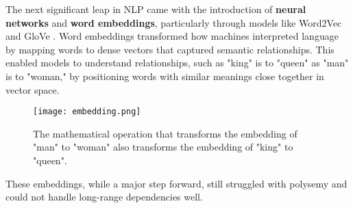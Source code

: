 

The next significant leap in NLP came with the introduction of \textbf{neural networks} and \textbf{word embeddings}, particularly through models like Word2Vec \cite{rong2014word2vec} and GloVe \cite{pennington2014glove}.
Word embeddings transformed how machines interpreted language by mapping words to dense vectors that captured semantic relationships.
This enabled models to understand relationships, such as "king" is to "queen" as "man" is to "woman," by positioning words with similar meanings close together in vector space.

\begin{figure}[!h]
    \centering
    \texttt{[image: embedding.png]}
    \caption{The mathematical operation that transforms the embedding of "man" to "woman" also transforms the embedding of "king" to "queen".}
    \vspace{0.1cm} \label{fig
} \end{figure}

These embeddings, while a major step forward, still struggled with polysemy and could not handle long-range dependencies well.

